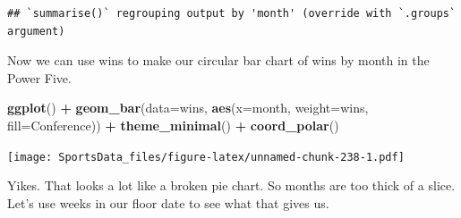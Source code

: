 \documentclass[
]{book}
\newenvironment{Shaded}{\begin{snugshade}}{\end{snugshade}}
\newcommand{\DataTypeTok}[1]{\textcolor[rgb]{0.13,0.29,0.53}{#1}}
\newcommand{\KeywordTok}[1]{\textcolor[rgb]{0.13,0.29,0.53}{\textbf{#1}}}
\newcommand{\NormalTok}[1]{#1}
\newcommand{\OperatorTok}[1]{\textcolor[rgb]{0.81,0.36,0.00}{\textbf{#1}}}
\newcommand{\StringTok}[1]{\textcolor[rgb]{0.31,0.60,0.02}{#1}}
\begin{document}
\begin{Shaded}
\end{Shaded}

\begin{verbatim}
## `summarise()` regrouping output by 'month' (override with `.groups` argument)
\end{verbatim}

Now we can use wins to make our circular bar chart of wins by month in the Power Five.

\begin{Shaded}
\begin{Highlighting}[]
\KeywordTok{ggplot}\NormalTok{() }\OperatorTok{+}\StringTok{ }\KeywordTok{geom_bar}\NormalTok{(}\DataTypeTok{data=}\NormalTok{wins, }\KeywordTok{aes}\NormalTok{(}\DataTypeTok{x=}\NormalTok{month, }\DataTypeTok{weight=}\NormalTok{wins, }\DataTypeTok{fill=}\NormalTok{Conference)) }\OperatorTok{+}\StringTok{ }\KeywordTok{theme_minimal}\NormalTok{() }\OperatorTok{+}\StringTok{ }\KeywordTok{coord_polar}\NormalTok{()}
\end{Highlighting}
\end{Shaded}

\texttt{[image: SportsData\_files/figure-latex/unnamed-chunk-238-1.pdf]}

Yikes. That looks a lot like a broken pie chart. So months are too thick of a slice. Let's use weeks in our floor date to see what that gives us.

\begin{Shaded}
\end{Shaded}
\end{document}

